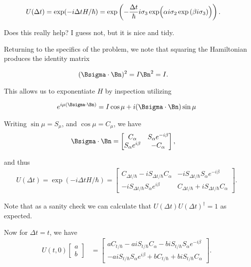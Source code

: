 \begin{align}\label{eqn:desaiCh5:610}
U(\Delta t) 
&=
\exp( -i \Delta t H /\hbar )
= 
\exp \left(
- \frac{\Delta t}{\hbar} i \sigma_3 \exp\Bigl( \alpha i \sigma_2 
\exp\left( \beta i \sigma_3 
\right)
\Bigr)
\right).
\end{align}

Does this really help?  I guess not, but it is nice and tidy.

Returning to the specifics of the problem, we note that squaring the Hamiltonian produces the identity matrix

\begin{align}\label{eqn:desaiCh5:615}
(\Bsigma \cdot \Bn)^2 &= I \Bn^2 = I.
\end{align}

This allows us to exponentiate $H$ by inspection utilizing

\begin{align}\label{eqn:desaiCh5:620}
e^{i \mu (\Bsigma \cdot \Bn) } = I \cos\mu + i (\Bsigma \cdot \Bn) \sin\mu
\end{align}

Writing $\sin\mu = S_\mu$, and $\cos\mu = C_\mu$, we have
\begin{align}\label{eqn:desaiCh5:625}
\Bsigma \cdot \Bn &=
\begin{bmatrix}
C_\alpha & S_\alpha e^{-i\beta} \\
S_\alpha e^{i\beta} & -C_\alpha
\end{bmatrix},
\end{align}

and thus
\begin{align}\label{eqn:desaiCh5:630}
U(\Delta t) = \exp( -i \Delta t H /\hbar )
=
\begin{bmatrix}
C_{\Delta t/\hbar} -i S_{\Delta t/\hbar} C_\alpha & -i S_{\Delta t/\hbar} S_\alpha e^{-i\beta} \\
-i S_{\Delta t/\hbar} S_\alpha e^{i\beta} & C_{\Delta t/\hbar} + i S_{\Delta t/\hbar} C_\alpha
\end{bmatrix}.
\end{align}

Note that as a sanity check we can calculate that $ U(\Delta t) U(\Delta t)^\dagger = 1$ as expected.

Now for $\Delta t = t$, we have 
\begin{align}\label{eqn:desaiCh5:640}
U(t,0) 
\begin{bmatrix}
a \\
b
\end{bmatrix}
&=
\begin{bmatrix}
a C_{t/\hbar} -a i S_{t/\hbar} C_\alpha  - b i S_{t/\hbar} S_\alpha e^{-i\beta} \\
-a i S_{t/\hbar} S_\alpha e^{i\beta} + b C_{t/\hbar} + b i S_{t/\hbar} C_\alpha
\end{bmatrix}.
\end{align}

